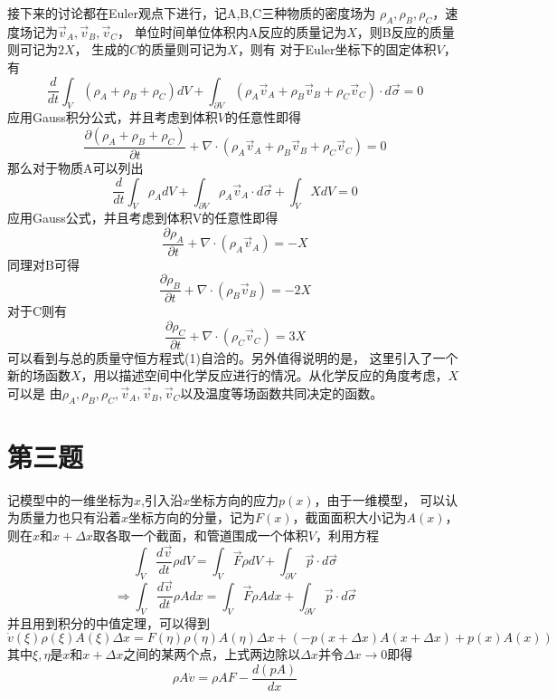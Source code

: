 \documentclass[UTF8]{ctexart}
\begin{document}
接下来的讨论都在Euler观点下进行，记A,B,C三种物质的密度场为
$\rho_A,\rho_B,\rho_C$，速度场记为$\vec v_A,\vec v_B,\vec v_C$，
单位时间单位体积内A反应的质量记为$X$，则B反应的质量则可记为$2X$，
生成的$C$的质量则可记为$X$，则有
\noindent 对于Euler坐标下的固定体积$V$，有
$$
\frac{d}{dt}\int_V (\rho_A+\rho_B+\rho_C) dV
+\int_{\partial V} (\rho_A \vec v_A+\rho_B \vec v_B+\rho_C \vec v_C) \cdot d\vec\sigma=0
$$
\noindent 应用Gauss积分公式，并且考虑到体积$V$的任意性即得
\begin{equation}
\frac {\partial (\rho_A+\rho_B+\rho_C)}{\partial t}
+\nabla \cdot (\rho_A \vec v_A+\rho_B \vec v_B+\rho_C \vec v_C)
=0
\tag{1}
\end{equation}
\noindent 那么对于物质A可以列出
$$
\frac{d}{dt} \int_V \rho_A dV
+\int_{\partial V} \rho_A \vec v_A \cdot d\vec\sigma
+\int_V X dV
=0
$$
\noindent 应用Gauss公式，并且考虑到体积V的任意性即得
$$
\frac{\partial \rho_A}{\partial t} + \nabla \cdot (\rho_A \vec v_A) = -X
$$
\noindent 同理对B可得
$$
\frac{\partial \rho_B}{\partial t} + \nabla \cdot (\rho_B \vec v_B) = -2X
$$
\noindent 对于C则有
$$
\frac{\partial \rho_C}{\partial t} + \nabla \cdot (\rho_C \vec v_C) = 3X
$$
\noindent 可以看到与总的质量守恒方程式(1)自洽的。另外值得说明的是，
这里引入了一个新的场函数$X$，用以描述空间中化学反应进行的情况。从化学反应的角度考虑，$X$可以是
由$\rho_A,\rho_B,\rho_C,\vec v_A,\vec v_B,\vec v_C$以及温度等场函数共同决定的函数。

\section{第三题}

记模型中的一维坐标为$x$,引入沿$x$坐标方向的应力$p(x)$，由于一维模型，
可以认为质量力也只有沿着$x$坐标方向的分量，记为$F(x)$，截面面积大小记为$A(x)$，
则在$x$和$x+\Delta x$取各取一个截面，和管道围成一个体积$V$，利用方程
$$
\int_V \frac{d\vec v}{dt} \rho dV = \int_V \vec F \rho dV + \int_{\partial V} \vec p \cdot d\vec \sigma
$$
$$
\Rightarrow
\int_V \frac{d\vec v}{dt} \rho A dx = \int_V \vec F \rho A dx + \int_{\partial V} \vec p \cdot d\vec \sigma
$$
\noindent 并且用到积分的中值定理，可以得到
$$
\dot v(\xi) \rho(\xi) A(\xi) \Delta x = F(\eta ) \rho(\eta) A(\eta) \Delta x + (-p(x+\Delta x)A(x+\Delta x)+p(x)A(x))
$$
\noindent 其中$\xi,\eta$是$x$和$x+\Delta x$之间的某两个点，上式两边除以$\Delta x$并令$\Delta x\rightarrow 0$即得
\begin{equation}
\rho A \dot v=\rho A F - \frac{d(pA)}{dx} \tag{1}
\end{equation}
\end{document}
